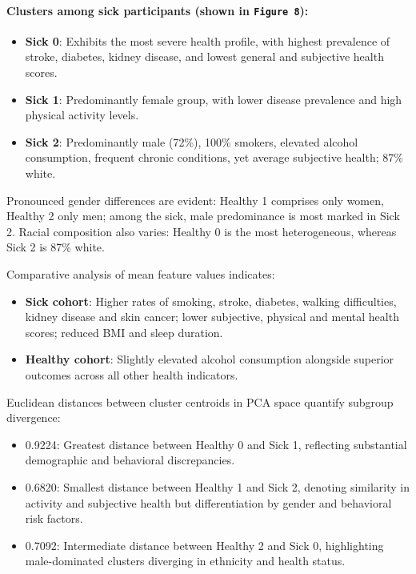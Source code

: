 \documentclass[12pt, a4paper]{article}
\begin{document}
\paragraph{Clusters among sick participants  (shown in \texttt{Figure 8}):}
\begin{itemize}
  \item \textbf{Sick 0}: Exhibits the most severe health profile, with highest prevalence of stroke, diabetes, kidney disease, and lowest general and subjective health scores.
  \item \textbf{Sick 1}: Predominantly female group, with lower disease prevalence and high physical activity levels.
  \item \textbf{Sick 2}: Predominantly male (72\%), 100\% smokers, elevated alcohol consumption, frequent chronic conditions, yet average subjective health; 87\% white.
\end{itemize}

Pronounced gender differences are evident: Healthy 1 comprises only women, Healthy 2 only men; among the sick, male predominance is most marked in Sick 2. Racial composition also varies: Healthy 0 is the most heterogeneous, whereas Sick 2 is 87\% white.

Comparative analysis of mean feature values indicates:
\begin{itemize}
  \item \textbf{Sick cohort}: Higher rates of smoking, stroke, diabetes, walking difficulties, kidney disease and skin cancer; lower subjective, physical and mental health scores; reduced BMI and sleep duration.
  \item \textbf{Healthy cohort}: Slightly elevated alcohol consumption alongside superior outcomes across all other health indicators.
\end{itemize}

Euclidean distances between cluster centroids in PCA space quantify subgroup divergence:
\begin{itemize}
  \item 0.9224: Greatest distance between Healthy 0 and Sick 1, reflecting substantial demographic and behavioral discrepancies.
  \item 0.6820: Smallest distance between Healthy 1 and Sick 2, denoting similarity in activity and subjective health but differentiation by gender and behavioral risk factors.
  \item 0.7092: Intermediate distance between Healthy 2 and Sick 0, highlighting male-dominated clusters diverging in ethnicity and health status.
\end{itemize}
\end{document}
